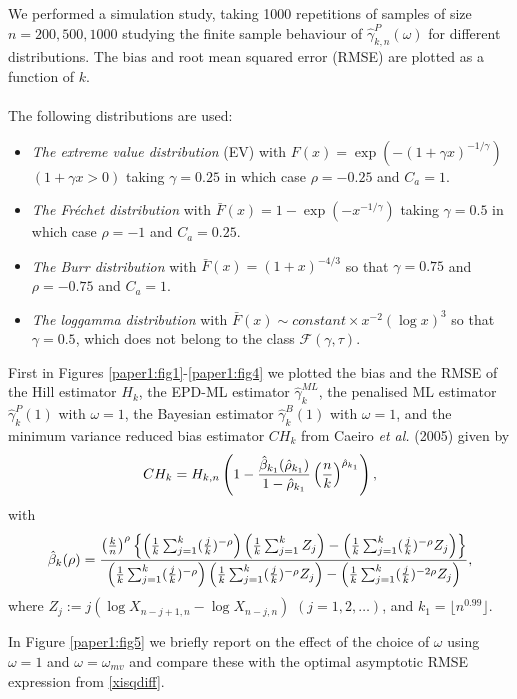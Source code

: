 \noindent We performed a simulation study, taking 1000 repetitions of samples of size $n=200, 500, 1000$ studying the finite sample behaviour of $\hat{\gamma}^P_{k,n}(\omega)$  for different distributions. The bias and root mean squared error (RMSE) are plotted as a function of $k$. 
\\\\
The following distributions are used:
\begin{itemize}
	\item 
	{\it The extreme value distribution} (EV) with
	$F(x)= \exp (-(1+\gamma x)^{-1/\gamma})$ $(1+\gamma x >0)$ taking $\gamma=0.25$ in which case $\rho=-0.25$ and $C_a=1$.
	\item
	{\it The Fr\'echet distribution} with $\bar{F}(x)= 1-\exp(-x^{-1/\gamma})$ taking $\gamma = 0.5$ in which case $\rho=-1$ and $C_a=0.25$.
	\item
	{\it The Burr distribution} with $\bar{F}(x)= (1+x)^{-4/3}$ so that $\gamma = 0.75$ and $\rho=-0.75$ and $C_a=1$.
	\item
	{\it The loggamma distribution} with $\bar{F}(x) \sim constant \times x^{-2}(\log x)^3$ so that $\gamma = 0.5$, which does not belong to the class $\mathcal{F}(\gamma,\tau)$.
\end{itemize}
First in Figures \ref{paper1:fig1}-\ref{paper1:fig4} we plotted the bias and the RMSE of the Hill estimator $H_{k}$, the EPD-ML estimator $\hat{\gamma}_{k}^{ML}$, the penalised ML estimator $\hat{\gamma}^P_{k}(1)$ with $\omega=1$, the Bayesian estimator $\hat{\gamma}^B_{k}(1)$ with $\omega=1$, and the minimum variance reduced bias estimator $CH_k$ from Caeiro {\it et al.} (2005) given by
\[
CH_k = H_{k,n}\left( 1- {\hat{\beta}_{k_1} (\hat{\rho}_{k_1}) \over 1- \hat{\rho}_{k_1}}\left({n \over k} \right)^{\hat{\rho}_{k_1}}\right),
\] 
with 
\[
\hat{\beta}_k (\rho) =
\frac{ \left({k \over n} \right)^{\rho} 
\left\{ \left({1 \over k} \sum_{j=1}^k ({j \over k})^{-\rho}\right) \left({1 \over k} \sum_{j=1}^k Z_j\right) 
-\left({1 \over k} \sum_{j=1}^k ({j \over k})^{-\rho} Z_j\right) 
\right\} }
{\left({1 \over k} \sum_{j=1}^k ({j \over k})^{-\rho} \right) \left({1 \over k} \sum_{j=1}^k ({j \over k})^{-\rho} Z_j\right) -\left({1 \over k} \sum_{j=1}^k ({j \over k})^{-2\rho} Z_j\right) },
\]
where $Z_j := j(\log X_{n-j+1,n}-\log X_{n-j,n})$ $(j=1,2,\ldots)$, and $k_1 = \lfloor n^{0.99}\rfloor$. 

\noindent In Figure \ref{paper1:fig5} we briefly report on the effect of the choice of $\omega$ using $\omega=1$ and $\omega= \omega_{mv}$ and compare these with the optimal asymptotic RMSE expression from \eqref{xisqdiff}.


